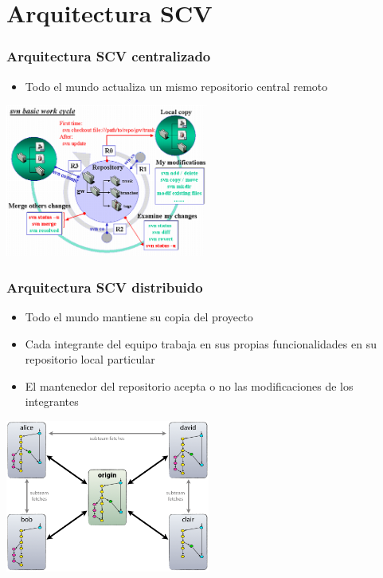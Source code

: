 \section{Arquitectura SCV}
\frame
{
\frametitle{Arquitectura SCV centralizado}
\begin{itemize}
 \item Todo el mundo actualiza un mismo repositorio central remoto
\end{itemize}

\begin{center}
 \includegraphics[height=5cm]{imgs/svnscheme.png}
\end{center}
}

\frame
{
\frametitle{Arquitectura SCV distribuido}
\begin{itemize}
 \item Todo el mundo mantiene su copia del proyecto
 \item Cada integrante del equipo trabaja en sus propias funcionalidades en su repositorio local particular
 \item El mantenedor del repositorio acepta o no las modificaciones de los integrantes
\end{itemize}

\begin{center}
 \includegraphics[height=5cm]{imgs/gitscheme.png}
\end{center}
}